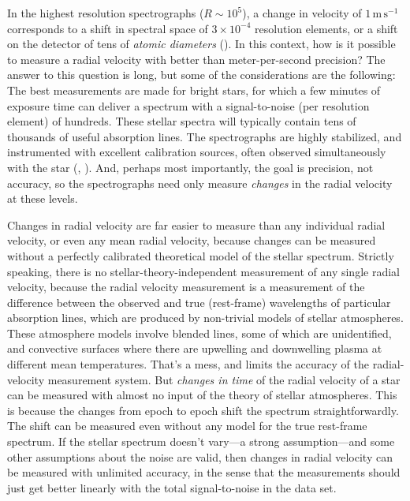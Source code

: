 \documentclass[modern]{aastex631}
\newcommand{\unit}[1]{\mathrm{#1}}
\newcommand{\m}{\unit{m}}
\newcommand{\s}{\unit{s}}
\newcommand{\mps}{\m\,\s^{-1}}
\begin{document}
In the highest resolution spectrographs ($R\sim 10^5$), a change in velocity of $1\,\mps$ corresponds to a shift in spectral space of $3\times 10^{-4}$ resolution elements, or a shift on the detector of tens of \emph{atomic diameters} (\citealt{zhaophd}).
In this context, how is it possible to measure a radial velocity with better than meter-per-second precision?
The answer to this question is long, but some of the considerations are the following:
The best measurements are made for bright stars, for which a few minutes of exposure time can deliver a spectrum with a signal-to-noise (per resolution element) of hundreds.
These stellar spectra will typically contain tens of thousands of useful absorption lines.
The spectrographs are highly stabilized, and instrumented with excellent calibration sources, often observed simultaneously with the star (\citep{simultaneousreference}, \citep{gascell}).
And, perhaps most importantly, the goal is precision, not accuracy, so the spectrographs need only measure \emph{changes} in the radial velocity at these levels.

Changes in radial velocity are far easier to measure than any individual radial velocity, or even any mean radial velocity, because changes can be measured without a perfectly calibrated theoretical model of the stellar spectrum.
Strictly speaking, there is no stellar-theory-independent measurement of any single radial velocity, because the radial velocity measurement is a measurement of the difference between the observed and true (rest-frame) wavelengths of particular absorption lines, which are produced by non-trivial models of stellar atmospheres.
These atmosphere models involve blended lines, some of which are unidentified, and convective surfaces where there are upwelling and downwelling plasma at different mean temperatures.
That's a mess, and limits the accuracy of the radial-velocity measurement system.
But \emph{changes in time} of the radial velocity of a star can be measured with almost no input of the theory of stellar atmospheres.
This is because the changes from epoch to epoch shift the spectrum straightforwardly.
The shift can be measured even without any model for the true rest-frame spectrum.
If the stellar spectrum doesn't vary---a strong assumption---and some other assumptions about the noise are valid, then changes in radial velocity can be measured with unlimited accuracy, in the sense that the measurements should just get better linearly with the total signal-to-noise in the data set.
\end{document}
